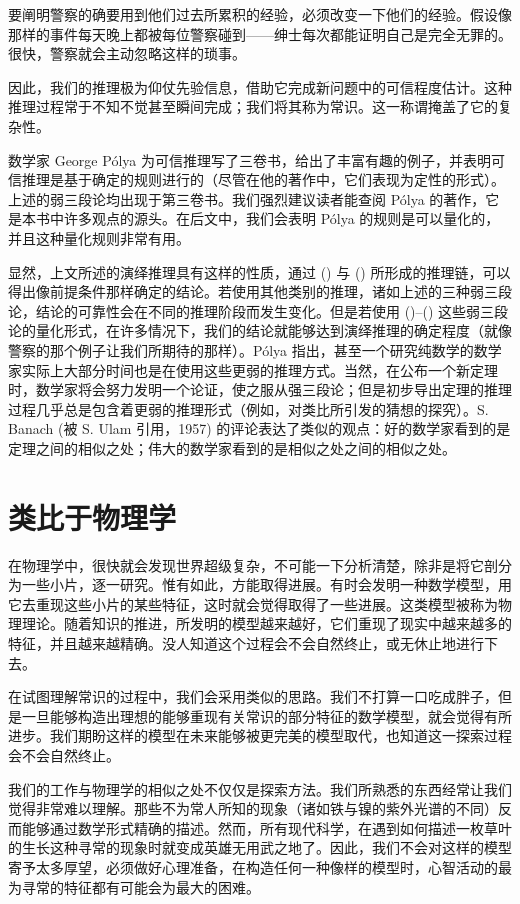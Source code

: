 要阐明警察的确要用到他们过去所累积的经验，必须改变一下他们的经验。假设像那样的事件每天晚上都被每位警察碰到——绅士每次都能证明自己是完全无罪的。很快，警察就会主动忽略这样的琐事。

因此，我们的推理极为仰仗先验信息，借助它完成新问题中的可信程度估计。这种推理过程常于不知不觉甚至瞬间完成；我们将其称为常识。这一称谓掩盖了它的复杂性。

数学家 George Pólya 为可信推理写了三卷书，给出了丰富有趣的例子，并表明可信推理是基于确定的规则进行的（尽管在他的著作中，它们表现为定性的形式）。上述的弱三段论均出现于第三卷书。我们强烈建议读者能查阅 Pólya 的著作，它是本书中许多观点的源头。在后文中，我们会表明 Pólya 的规则是可以量化的，并且这种量化规则非常有用。

显然，上文所述的演绎推理具有这样的性质，通过 (\in[syllogism-1]) 与 (\in[syllogism-2]) 所形成的推理链，可以得出像前提条件那样确定的结论。若使用其他类别的推理，诸如上述的三种弱三段论，结论的可靠性会在不同的推理阶段而发生变化。但是若使用 (\in[weak-1])--(\in[weak-3]) 这些弱三段论的量化形式，在许多情况下，我们的结论就能够达到演绎推理的确定程度（就像警察的那个例子让我们所期待的那样）。Pólya 指出，甚至一个研究纯数学的数学家实际上大部分时间也是在使用这些更弱的推理方式。当然，在公布一个新定理时，数学家将会努力发明一个论证，使之服从强三段论；但是初步导出定理的推理过程几乎总是包含着更弱的推理形式（例如，对类比所引发的猜想的探究）。S. Banach (被 S. Ulam 引用，1957) 的评论表达了类似的观点：好的数学家看到的是定理之间的相似之处；伟大的数学家看到的是相似之处之间的相似之处。

\section{类比于物理学}

在物理学中，很快就会发现世界超级复杂，不可能一下分析清楚，除非是将它剖分为一些小片，逐一研究。惟有如此，方能取得进展。有时会发明一种数学模型，用它去重现这些小片的某些特征，这时就会觉得取得了一些进展。这类模型被称为物理理论。随着知识的推进，所发明的模型越来越好，它们重现了现实中越来越多的特征，并且越来越精确。没人知道这个过程会不会自然终止，或无休止地进行下去。

在试图理解常识的过程中，我们会采用类似的思路。我们不打算一口吃成胖子，但是一旦能够构造出理想的能够重现有关常识的部分特征的数学模型，就会觉得有所进步。我们期盼这样的模型在未来能够被更完美的模型取代，也知道这一探索过程会不会自然终止。

我们的工作与物理学的相似之处不仅仅是探索方法。我们所熟悉的东西经常让我们觉得非常难以理解。那些不为常人所知的现象（诸如铁与镍的紫外光谱的不同）反而能够通过数学形式精确的描述。然而，所有现代科学，在遇到如何描述一枚草叶的生长这种寻常的现象时就变成英雄无用武之地了。因此，我们不会对这样的模型寄予太多厚望，必须做好心理准备，在构造任何一种像样的模型时，心智活动的最为寻常的特征都有可能会为最大的困难。

